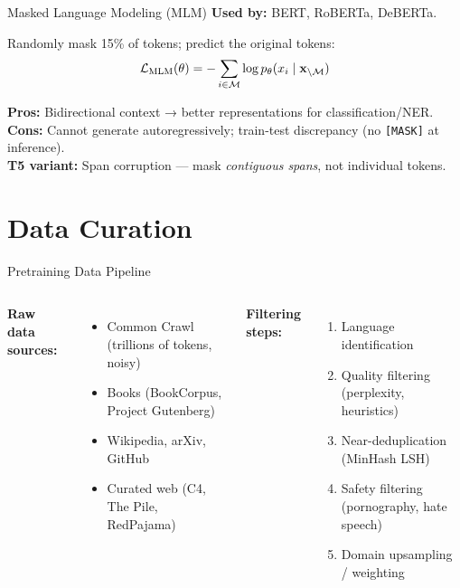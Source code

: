 \documentclass[aspectratio=169,10pt]{beamer}
\begin{document}
\begin{frame}{Masked Language Modeling (MLM)}
  \textbf{Used by:} BERT, RoBERTa, DeBERTa.
  \begin{tcolorbox}[hitbox, title=Objective: Fill in the Blank]
    Randomly mask 15\% of tokens; predict the original tokens:
    \[
      \mathcal{L}_\text{MLM}(\theta) = -\sum_{i \in \mathcal{M}} \log p_\theta(x_i \mid \mathbf{x}_{\setminus \mathcal{M}})
    \]
  \end{tcolorbox}
  \vspace{0.4em}
  \textbf{Pros:} Bidirectional context → better representations for classification/NER.\\
  \textbf{Cons:} Cannot generate autoregressively; train-test discrepancy (no \texttt{[MASK]} at inference).
  \vspace{0.4em}\\
  \textbf{T5 variant:} Span corruption — mask \emph{contiguous spans}, not individual tokens.
\end{frame}

\section{Data Curation}

\begin{frame}{Pretraining Data Pipeline}
  \begin{columns}[T]
      \textbf{Raw data sources:}
      \begin{itemize}
        \item Common Crawl (trillions of tokens, noisy)
        \item Books (BookCorpus, Project Gutenberg)
        \item Wikipedia, arXiv, GitHub
        \item Curated web (C4, The Pile, RedPajama)
      \end{itemize}
      \vspace{0.5em}
      \textbf{Filtering steps:}
      \begin{enumerate}
        \item Language identification
        \item Quality filtering (perplexity, heuristics)
        \item Near-deduplication (MinHash LSH)
        \item Safety filtering (pornography, hate speech)
        \item Domain upsampling / weighting
      \end{enumerate}
  \end{columns}
\end{frame}
\end{document}
